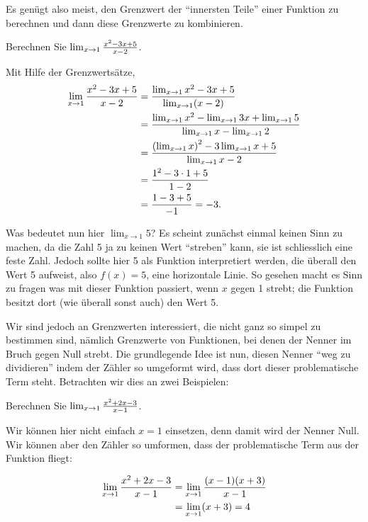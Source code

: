 Es genügt also meist, den Grenzwert der ``innersten Teile'' einer Funktion zu berechnen und dann diese Grenzwerte zu kombinieren. 


\begin{example}
Berechnen Sie $\lim_{x\to 1}{x^2-3x+5\over x-2}$. 
\end{example}

\begin{solution}
Mit Hilfe der Grenzwertsätze, 
\begin{align*}
\lim_{x\to 1}{x^2-3x+5\over x-2}&=
\dfrac{\lim_{x\to 1}x^2-3x+5}{\lim_{x\to1}(x-2)} \\
&=\frac{\lim_{x\to 1}x^2-\lim_{x\to1}3x+\lim_{x\to1}5}{\lim_{x\to1}x-\lim_{x\to1}2} \\
&=\dfrac{\left(\lim_{x\to 1}x\right)^2-3\lim_{x\to1}x+5}{\lim_{x\to1}x-2} \\
&=\dfrac{1^2-3\cdot1+5}{1-2} \\
&=\dfrac{1-3+5}{-1} = -3.
\end{align*}
\end{solution}

Was bedeutet nun hier $\lim_{x\to1}5$? Es scheint zunächst einmal keinen Sinn zu machen, da die Zahl 5 ja zu keinen Wert ``streben'' kann, sie ist schliesslich eine feste Zahl. Jedoch sollte hier 5 als Funktion interpretiert werden, die überall den Wert 5 aufweist, also $f(x)=5$, eine horizontale Linie. So gesehen macht es Sinn zu fragen was mit dieser Funktion passiert, wenn $x$ gegen 1 strebt; die Funktion besitzt dort (wie überall sonst auch) den Wert 5.

Wir sind jedoch an Grenzwerten interessiert, die nicht ganz so simpel zu bestimmen sind, nämlich Grenzwerte von Funktionen, bei denen der Nenner im Bruch gegen Null strebt. Die grundlegende Idee ist nun, diesen Nenner ``weg zu dividieren'' indem der Zähler so umgeformt wird, dass dort dieser problematische Term steht. Betrachten wir dies an zwei Beispielen:



\begin{example}
Berechnen Sie $\lim_{x\to1}{x^2+2x-3\over x-1}$. 
\end{example}
\begin{solution}
Wir können hier nicht einfach $x=1$ einsetzen, denn damit wird der Nenner Null. Wir können aber den Zähler so umformen, dass der problematische Term aus der Funktion fliegt:

\begin{align*}
\lim_{x\to1}{x^2+2x-3\over x-1}&=\lim_{x\to1}{(x-1)(x+3)\over x-1} \\
&=\lim_{x\to1}(x+3)=4
\end{align*}
\end{solution}


